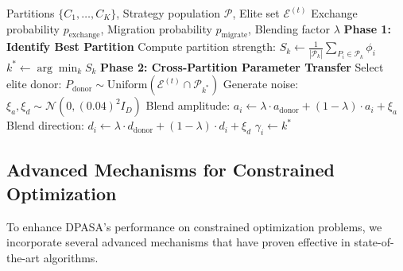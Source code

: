 \documentclass[11pt]{article}
\begin{document}
\begin{algorithm}[h]
\caption{Inter-Partition Migration Mechanism}
\label{alg:exchange}
\begin{algorithmic}[1]
\Require Partitions $\{C_1, \ldots, C_K\}$, Strategy population $\mathcal{P}$, Elite set $\mathcal{E}^{(t)}$
\Require Exchange probability $p_{\text{exchange}}$, Migration probability $p_{\text{migrate}}$, Blending factor $\lambda$
\State \textbf{Phase 1: Identify Best Partition}
    \State Compute partition strength: $S_k \leftarrow \frac{1}{|\mathcal{P}_k|} \sum_{P_i \in \mathcal{P}_k} \phi_i$
\EndFor
\State $k^* \leftarrow \arg\min_k S_k$ 
\State \textbf{Phase 2: Cross-Partition Parameter Transfer}
         
            \State Select elite donor: $P_{\text{donor}} \sim \text{Uniform}(\mathcal{E}^{(t)} \cap \mathcal{P}_{k^*})$
            \State Generate noise: $\xi_a, \xi_d \sim \mathcal{N}(0, (0.04)^2 I_D)$
            \State Blend amplitude: $a_i \leftarrow \lambda \cdot a_{\text{donor}} + (1-\lambda) \cdot a_i + \xi_a$
            \State Blend direction: $d_i \leftarrow \lambda \cdot d_{\text{donor}} + (1-\lambda) \cdot d_i + \xi_d$
             
                \State $\gamma_i \leftarrow k^*$ 
            \EndIf
        \EndIf
    \EndFor
\EndFor
\end{algorithmic}
\end{algorithm}






\subsection{Advanced Mechanisms for Constrained Optimization}
\label{sec:advanced_mechanisms}

To enhance DPASA's performance on constrained optimization problems, we incorporate several advanced mechanisms that have proven effective in state-of-the-art algorithms.
\end{document}
